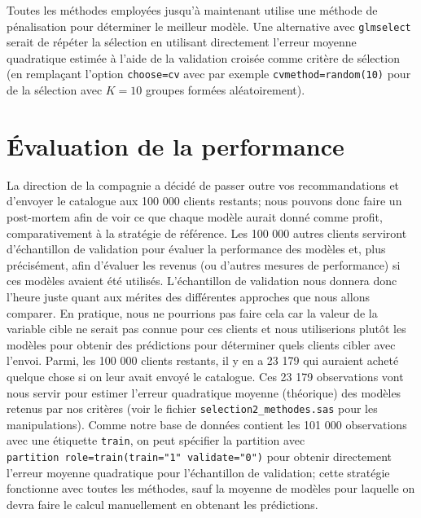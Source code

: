 \documentclass[
  11pt,
  letterpaper,
]{book}
\theoremstyle{definition}
\theoremstyle{definition}
\theoremstyle{definition}
\theoremstyle{remark}
\begin{document}
Toutes les méthodes employées jusqu'à maintenant utilise une méthode de pénalisation pour déterminer le meilleur modèle. Une alternative avec \texttt{glmselect} serait de répéter la sélection en utilisant directement l'erreur moyenne quadratique estimée à l'aide de la validation croisée comme critère de sélection (en remplaçant l'option \texttt{choose=cv} avec par exemple \texttt{cvmethod=random(10)} pour de la sélection avec \(K=10\) groupes formées aléatoirement).

\hypertarget{uxe9valuation-de-la-performance}{%
\section{Évaluation de la performance}\label{uxe9valuation-de-la-performance}}

La direction de la compagnie a décidé de passer outre vos recommandations et d'envoyer le catalogue aux 100 000 clients restants; nous pouvons donc faire un post-mortem afin de voir ce que chaque modèle aurait donné comme profit, comparativement à la stratégie de référence.
Les 100 000 autres clients serviront d'échantillon de validation pour évaluer la performance des modèles et, plus précisément, afin d'évaluer les revenus (ou d'autres mesures de performance) si ces modèles avaient été utilisés. L'échantillon de validation nous donnera donc l'heure juste quant aux mérites des différentes approches que nous allons comparer. En pratique, nous ne pourrions pas faire cela car la valeur de la variable cible ne serait pas connue pour ces clients et nous utiliserions plutôt les modèles pour obtenir des prédictions pour déterminer quels clients cibler avec l'envoi. Parmi, les 100 000 clients restants, il y en a 23 179 qui auraient acheté quelque chose si on leur avait envoyé le catalogue. Ces 23 179 observations vont nous servir pour estimer l'erreur quadratique moyenne (théorique) des modèles retenus par nos critères (voir le fichier \texttt{selection2\_methodes.sas} pour les manipulations). Comme notre base de données contient les 101 000 observations avec une étiquette \texttt{train}, on peut spécifier la partition avec \texttt{partition\ role=train(train="1"\ validate="0")} pour obtenir directement l'erreur moyenne quadratique pour l'échantillon de validation; cette stratégie fonctionne avec toutes les méthodes, sauf la moyenne de modèles pour laquelle on devra faire le calcul manuellement en obtenant les prédictions.
\end{document}
